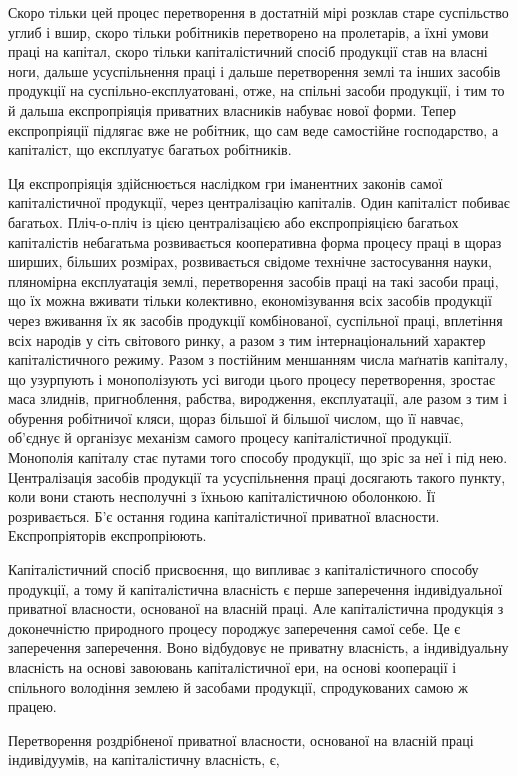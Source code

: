 Скоро тільки цей процес перетворення в достатній мірі розклав
старе суспільство углиб і вшир, скоро тільки робітників
перетворено на пролетарів, а їхні умови праці на капітал, скоро
тільки капіталістичний спосіб продукції став на власні ноги,
дальше усуспільнення праці і дальше перетворення землі та
інших засобів продукції на суспільно-експлуатовані, отже, на
спільні засоби продукції, і тим то й дальша експропріяція приватних
власників набуває нової форми. Тепер експропріяції
підлягає вже не робітник, що сам веде самостійне господарство,
а капіталіст, що експлуатує багатьох робітників.

Ця експропріяція здійснюється наслідком гри іманентних законів
самої капіталістичної продукції, через централізацію капіталів.
Один капіталіст побиває багатьох. Пліч-о-пліч із цією
централізацією або експропріяцією багатьох капіталістів небагатьма
розвивається кооперативна форма процесу праці в
щораз ширших, більших розмірах, розвивається свідоме технічне
застосування науки, пляномірна експлуатація землі, перетворення
засобів праці на такі засоби праці, що їх можна
вживати тільки колективно, економізування всіх засобів продукції
через вживання їх як засобів продукції комбінованої,
суспільної праці, вплетіння всіх народів у сіть світового ринку,
а разом з тим інтернаціональний характер капіталістичного режиму.
Разом з постійним меншанням числа маґнатів капіталу,
що узурпують і монополізують усі вигоди цього процесу перетворення,
зростає маса злиднів, пригноблення, рабства, виродження,
експлуатації, але разом з тим і обурення робітничої
кляси, щораз більшої й більшої числом, що її навчає, об’єднує
й організує механізм самого процесу капіталістичної продукції.
Монополія капіталу стає путами того способу продукції, що
зріс за неї і під нею. Централізація засобів продукції та усуспільнення
праці досягають такого пункту, коли вони стають
несполучні з їхньою капіталістичною оболонкою. Її розривається.
Б’є остання година капіталістичної приватної власности.
Експропріяторів експропріюють.

Капіталістичний спосіб присвоєння, що випливає з капіталістичного
способу продукції, а тому й капіталістична власність
є перше заперечення індивідуальної приватної власности, основаної
на власній праці. Але капіталістична продукція з доконечністю
природного процесу породжує заперечення самої себе.
Це є заперечення заперечення. Воно відбудовує не приватну
власність, а індивідуальну власність на основі завоювань капіталістичної
ери, на основі кооперації і спільного володіння землею
й засобами продукції, спродукованих самою ж працею.

Перетворення роздрібненої приватної власности, основаної
на власній праці індивідуумів, на капіталістичну власність, є,
\parbreak{}  %
